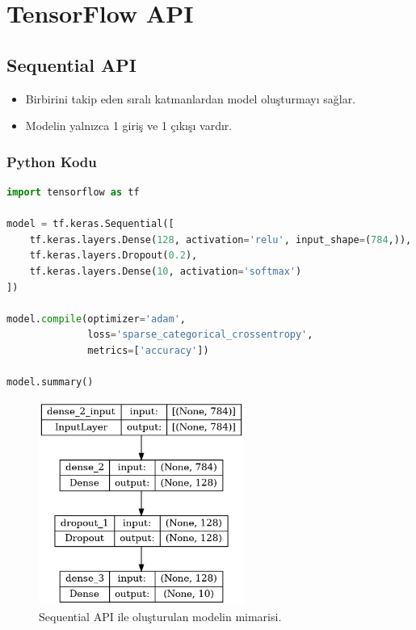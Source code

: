 \section{TensorFlow API}
\subsection{Sequential API}
\begin{itemize}
    \item Birbirini takip eden sıralı katmanlardan model oluşturmayı sağlar.
    \item Modelin yalnızca 1 giriş ve 1 çıkışı vardır.
\end{itemize}

\subsubsection{Python Kodu}

\begin{lstlisting}[language=Python]
import tensorflow as tf

model = tf.keras.Sequential([
    tf.keras.layers.Dense(128, activation='relu', input_shape=(784,)),
    tf.keras.layers.Dropout(0.2),
    tf.keras.layers.Dense(10, activation='softmax')
])

model.compile(optimizer='adam',
              loss='sparse_categorical_crossentropy',
              metrics=['accuracy'])

model.summary()
\end{lstlisting}

\begin{figure}[ht]
    \centering
    \includegraphics[width=0.6\textwidth]{images/sequential_model.png}
    \caption{Sequential API ile oluşturulan modelin mimarisi.}
    \label{fig:enter-label}
\end{figure}

